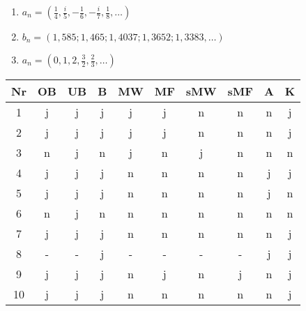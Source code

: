 \documentclass[12pt,answers]{exam}
\begin{document}
\begin{questions}
\begin{solution}
\begin{enumerate}
\item $a_n=(\frac{1}{4},\frac{i}{5},-\frac{1}{6},-\frac{i}{7},\frac{1}{8},\dots)$
\item $b_n=(1,585;1,465;1,4037;1,3652;1,3383,\dots)$
\item $a_n=(0,1,2,\frac{3}{2},\frac{2}{3},\dots)$
\end{enumerate}
\begin{center}
\begin{tabular}{|c|c|c|c|c|c|c|c|c|c|}
\hline
Nr & OB & UB & B & MW & MF & sMW & sMF & A & K\\
\hline
1 & j & j & j & j & j & n & n & n & j \\
\hline
2 & j & j & j & j & j & n & n & n & j \\
\hline
3 & n & j & n & j & n & j & n & n & n \\
\hline
4 & j & j & j & n & n & n & n & j & j \\
\hline
5 & j & j & j & n & n & n & n & j & n \\
\hline
6 & n & j & n & n & n & n & n & n & n \\
\hline
7 & j & j & j & n & n & n & n & n & j \\
\hline
8 & - & - & j & - & - & - & - & j & j \\
\hline
9 & j & j & j & n & j & n & j & n & j \\
\hline
10 & j & j & j & n & n & n & n & n & j \\
\hline
\end{tabular}
\end{center}
\end{solution}

\pagebreak



\end{questions}
\end{document}
